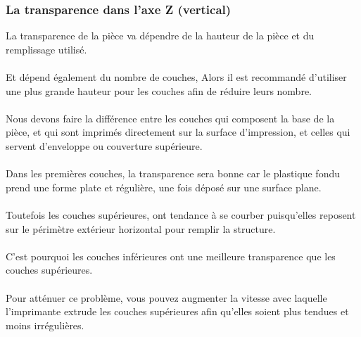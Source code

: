 \documentclass[11pt,a4paper]{article}
\begin{document}
		\subsubsection{La transparence dans l’axe Z (vertical)}La transparence de la pièce va dépendre de la hauteur de la pièce et du remplissage utilisé.
\\\\
Et dépend également du nombre de couches, Alors il est recommandé d’utiliser une plus grande hauteur pour les couches  afin de réduire leurs nombre.
\\\\
Nous devons faire la différence entre les couches qui composent la base de la pièce, et qui sont imprimés directement sur la surface d’impression, et celles qui servent d’enveloppe ou couverture supérieure.
\\\\
Dans les premières couches, la transparence sera bonne car le plastique fondu prend une forme plate et régulière, une fois déposé sur une surface plane.
\\\\
Toutefois les couches supérieures, ont tendance à se courber puisqu’elles reposent sur le périmètre extérieur horizontal pour remplir la structure.
\\\\
C’est pourquoi les couches inférieures ont une meilleure transparence que les couches supérieures.
\\\\
Pour atténuer ce problème, vous pouvez augmenter la vitesse avec laquelle l’imprimante extrude les couches supérieures afin qu’elles soient plus tendues et moins irrégulières.
\end{document}
